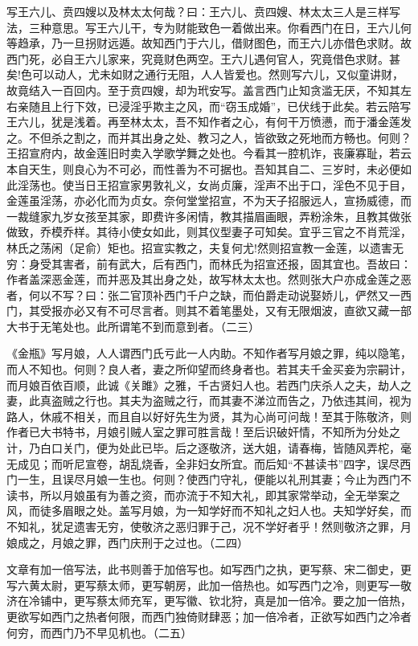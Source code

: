 \begin{showcontents}{}
{写王六儿、贲四嫂以及林太太何哉？曰：王六儿、贲四嫂、林太太三人是三样写法，三种意思。写王六儿干，专为财能致色一着做出来。你看西门在日，王六儿何等趋承，乃一旦拐财远遁。故知西门于六儿，借财图色，而王六儿亦借色求财。故西门死，必自王六儿家来，究竟财色两空。王六儿遇何官人，究竟借色求财。甚矣!色可以动人，尤未如财之通行无阻，人人皆爱也。然则写六儿，又似童讲财，故竟结入一百回内。至于贲四嫂，却为玳安写。盖言西门止知贪滥无厌，不知其左右亲随且上行下效，已浸淫乎欺主之风，而“窃玉成婚”，已伏线于此矣。若云陪写王六儿，犹是浅着。再至林太太，吾不知作者之心，有何干万愤懑，而于潘金莲发之。不但杀之割之，而并其出身之处、教习之人，皆欲致之死地而方畅也。何则？王招宣府内，故金莲旧时卖入学歌学舞之处也。今看其一腔机诈，丧廉寡耻，若云本自天生，则良心为不可必，而性善为不可据也。吾知其自二、三岁时，未必便如此淫荡也。使当日王招宣家男敦礼义，女尚贞廉，淫声不出于口，淫色不见于目，金莲虽淫荡，亦必化而为贞女。奈何堂堂招宣，不为天子招服远人，宣扬威德，而一裁缝家九岁女孩至其家，即费许多闲情，教其描眉画眼，弄粉涂朱，且教其做张做致，乔模乔样。其待小使女如此，则其仪型妻子可知矣。宜乎三官之不肖荒淫，林氏之荡闲（足俞）矩也。招宣实教之，夫复何尤!然则招宣教一金莲，以遗害无穷：身受其害者，前有武大，后有西门，而林氏为招宣还报，固其宜也。吾故曰：作者盖深恶金莲，而并恶及其出身之处，故写林太太也。然则张大户亦成金莲之恶者，何以不写？曰：张二官顶补西门千户之缺，而伯爵走动说娶娇儿，俨然又一西门，其受报亦必又有不可尽言者。则其不着笔墨处，又有无限烟波，直欲又藏一部大书于无笔处也。此所谓笔不到而意到者。（二三）

《金瓶》写月娘，人人谓西门氏亏此一人内助。不知作者写月娘之罪，纯以隐笔，而人不知也。何则？良人者，妻之所仰望而终身者也。若其夫千金买妾为宗嗣计，而月娘百依百顺，此诚《关雎》之雅，千古贤妇人也。若西门庆杀人之夫，劫人之妻，此真盗贼之行也。其夫为盗贼之行，而其妻不涕泣而告之，乃依违其间，视为路人，休戚不相关，而且自以好好先生为贤，其为心尚可问哉！至其于陈敬济，则作者已大书特书，月娘引贼人室之罪可胜言哉！至后识破奸情，不知所为分处之计，乃白口关门，便为处此已毕。后之逐敬济，送大姐，请春梅，皆随风弄柁，毫无成见；而听尼宣卷，胡乱烧香，全非妇女所宜。而后知“不甚读书”四字，误尽西门一生，且误尽月娘一生也。何则？使西门守礼，便能以礼刑其妻；今止为西门不读书，所以月娘虽有为善之资，而亦流于不知大礼，即其家常举动，全无举案之风，而徒多眉眼之处。盖写月娘，为一知学好而不知礼之妇人也。夫知学好矣，而不知礼，犹足遗害无穷，使敬济之恶归罪于己，况不学好者乎！然则敬济之罪，月娘成之，月娘之罪，西门庆刑于之过也。（二四）

文章有加一倍写法，此书则善于加倍写也。如写西门之执，更写蔡、宋二御史，更写六黄太尉，更写蔡太师，更写朝房，此加一倍热也。如写西门之冷，则更写一敬济在冷铺中，更写蔡太师充军，更写徽、钦北狩，真是加一倍冷。要之加一倍热，更欲写如西门之热者何限，而西门独倚财肆恶；加一倍冷者，正欲写如西门之冷者何穷，而西门乃不早见机也。（二五）

}
\end{showcontents}
